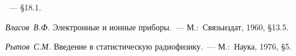 
\begin{lab:literature}
    \item \Kirichenko~--- \S 18.1.
	\item *\textit{Власов~В.Ф.} Электронные и ионные приборы.~--- М.:~Связьиздат,
1960, \S 13.5.
	\item *\textit{Рытов~С.М.} Введение в статистическую радиофизику.~---
М.:~Наука, 1976, \S 5.
\end{lab:literature}
